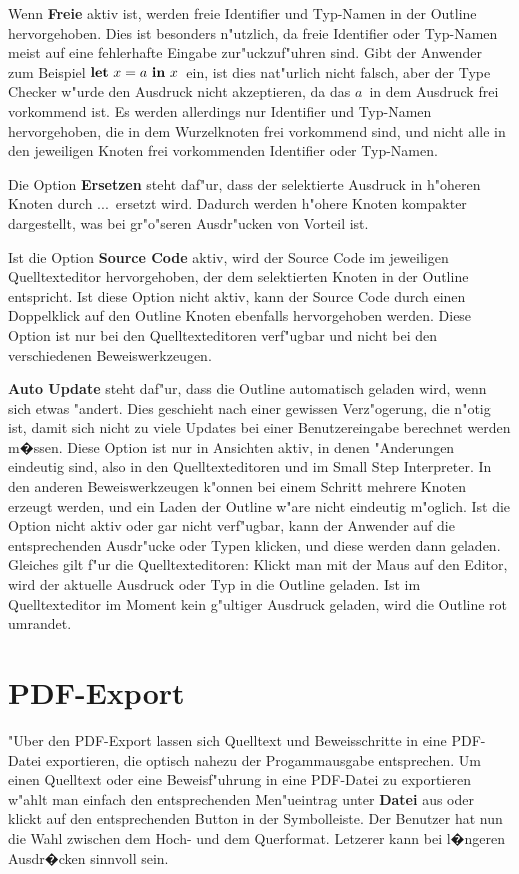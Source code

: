 Wenn {\bf Freie} aktiv ist, werden freie Identifier und Typ-Namen in der
Outline hervorgehoben. Dies ist besonders n"utzlich, da freie Identifier
oder Typ-Namen meist auf eine fehlerhafte Eingabe zur"uckzuf"uhren sind.
Gibt der Anwender zum Beispiel \glqq$\textbf{let}\ x = a\ \textbf{in}\ x$\grqq\ ein, ist 
dies nat"urlich nicht falsch, aber der Type Checker w"urde den Ausdruck
nicht akzeptieren, da das \glqq$a$\grqq\ in dem Ausdruck frei 
vorkommend ist. Es werden allerdings nur Identifier und Typ-Namen
hervorgehoben, die in dem Wurzelknoten frei vorkommend sind, und nicht
alle in den jeweiligen Knoten frei vorkommenden Identifier oder Typ-Namen.

Die Option {\bf Ersetzen} steht daf"ur, dass der selektierte Ausdruck
in h"oheren Knoten durch \glqq...\grqq\ ersetzt wird. Dadurch
werden h"ohere Knoten kompakter dargestellt, was bei gr"o"seren Ausdr"ucken
von Vorteil ist.

Ist die Option {\bf Source Code} aktiv, wird der Source Code im jeweiligen
Quelltexteditor hervorgehoben, der dem selektierten Knoten in der Outline
entspricht. Ist diese Option nicht aktiv, kann der Source Code durch einen
Doppelklick auf den Outline Knoten ebenfalls hervorgehoben werden. Diese
Option ist nur bei den Quelltexteditoren verf"ugbar und nicht bei den
verschiedenen Beweiswerkzeugen.

{\bf Auto Update} steht daf"ur, dass die Outline automatisch geladen wird,
wenn sich etwas "andert. Dies geschieht nach einer gewissen Verz"ogerung,
die n"otig ist, damit sich nicht zu viele Updates bei einer Benutzereingabe 
berechnet werden m�ssen. Diese Option
ist nur in Ansichten aktiv, in denen "Anderungen eindeutig sind, also in den
Quelltexteditoren und im Small Step Interpreter. In den anderen
Beweiswerkzeugen k"onnen bei einem Schritt mehrere Knoten erzeugt werden,
und ein Laden der Outline w"are nicht eindeutig m"oglich.
Ist die Option nicht aktiv oder gar nicht verf"ugbar, kann der Anwender auf 
die entsprechenden Ausdr"ucke oder Typen klicken, und diese werden dann geladen.
Gleiches gilt f"ur die Quelltexteditoren: Klickt man mit der Maus auf den
Editor, wird der aktuelle Ausdruck oder Typ in die Outline geladen. Ist im
Quelltexteditor im Moment kein g"ultiger Ausdruck geladen, wird die Outline
rot umrandet.

\section {PDF-Export}
\label{PDF-Export}
"Uber den PDF-Export lassen sich Quelltext und Beweisschritte in eine PDF-Datei
exportieren, die optisch nahezu der Progammausgabe entsprechen. Um einen Quelltext
oder eine Beweisf"uhrung in eine PDF-Datei zu exportieren w"ahlt man einfach
den entsprechenden Men"ueintrag unter {\bf Datei} aus oder klickt auf den 
entsprechenden Button in der Symbolleiste. Der Benutzer hat nun die Wahl zwischen dem Hoch- und
dem Querformat. Letzerer kann bei l�ngeren Ausdr�cken sinnvoll sein.

